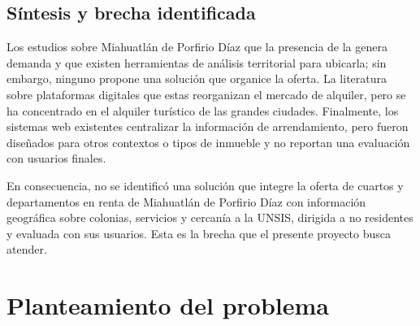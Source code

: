 \subsection{Síntesis y brecha identificada}
Los estudios sobre Miahuatlán de Porfirio Díaz \parencite{AvilaFlores2020, ZepedaGarcia2019}  que la presencia de la  genera demanda  y que existen herramientas de análisis territorial para ubicarla; sin embargo, ninguno propone una solución que organice la oferta. La literatura sobre plataformas digitales \parencite{GarridoRodriguez2025}  que estas reorganizan el mercado de alquiler, pero se ha concentrado en el alquiler turístico de las grandes ciudades.  Finalmente, los sistemas web existentes \parencite{MejiaAvecias2023, Valenzuela2024, Bisquera2026, Oluwadare2025}  centralizar la información de arrendamiento, pero fueron diseñados para otros contextos o tipos de inmueble y no reportan una evaluación  con usuarios finales.

En consecuencia, no se identificó una solución que integre la oferta de cuartos y departamentos en renta de Miahuatlán de Porfirio Díaz con información geográfica sobre colonias, servicios y cercanía a la UNSIS,  dirigida a  no residentes y evaluada con sus usuarios. Esta es la brecha que el presente proyecto busca atender.

\section{Planteamiento del problema}

